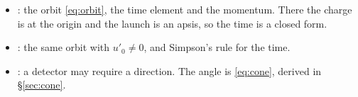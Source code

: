 \documentclass{leveldoc}
\begin{document}
\begin{itemize}
  \item {}: the orbit \eqref{eq:orbit}, the time element and the
    momentum. There the charge is at the origin and the launch is an apsis, so the time
    is a closed form.
  \item {}: the same orbit with $u'_0 \ne 0$, and Simpson's rule for
    the time.
  \item {}: a detector may require a direction. The angle
    is \eqref{eq:cone}, derived in §\ref{sec:cone}.
\end{itemize}

\levelfileappendix
\end{document}
